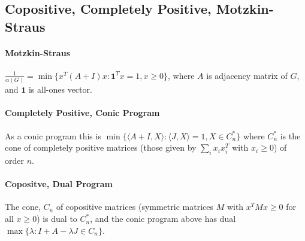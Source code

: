 \documentclass[letterpaper,11pt,oneside,onecolumn]{article}
\begin{document}
\subsection*{Copositive, Completely Positive, Motzkin-Straus}
\paragraph{Motzkin-Straus} $\frac{1}{\alpha(G)} = \min\{x^T(A+I)x : \textbf{1}^Tx = 1, x\geq 0\}$, where $A$ is adjacency matrix of $G$, and $\textbf{1}$ is all-ones vector.
\paragraph{Completely Positive, Conic Program} As a conic program this is $\min\{\langle A+I, X\rangle : \langle J, X\rangle = 1, X \in C_n^*\}$ where $C_n^*$ is the cone of completely positive matrices (those given by $\sum_i x_i x_i^T$ with $x_i \geq 0$) of order $n$.
\paragraph{Copositve, Dual Program} The cone, $C_n$ of copositive matrices (symmetric matrices $M$ with $x^TMx \geq 0$ for all $x \geq 0$) is dual to $C_n^*$, and the conic program above has dual $\max\{\lambda : I + A -\lambda J \in C_n \}$.
\end{document}
